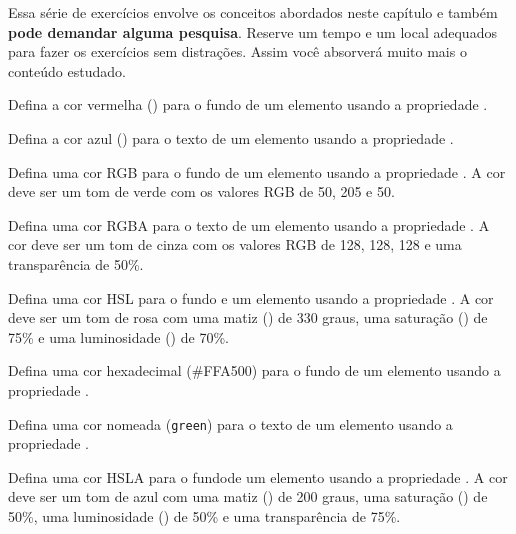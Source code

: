 Essa série de exercícios envolve os conceitos abordados neste capítulo e também \textbf{pode demandar alguma pesquisa}. Reserve um tempo e um local adequados para fazer os exercícios sem distrações. Assim você absorverá muito mais o conteúdo estudado.

\begin{exercise}
Defina a cor vermelha () para o fundo de um elemento usando a propriedade .
\end{exercise}

\begin{exercise}
Defina a cor azul () para o texto de um elemento usando a propriedade .
\end{exercise}

\begin{exercise}
Defina uma cor RGB para o fundo de um elemento usando a propriedade . A cor deve ser um tom de verde com os valores RGB de 50, 205 e 50.
\end{exercise}

\begin{exercise}
Defina uma cor RGBA para o texto de um elemento usando a propriedade . A cor deve ser um tom de cinza com os valores RGB de 128, 128, 128 e uma transparência de 50\%.
\end{exercise}

\begin{exercise}
Defina uma cor HSL para o fundo e um elemento usando a propriedade . A cor deve ser um tom de rosa com uma matiz () de 330 graus, uma saturação () de 75\% e uma luminosidade () de 70\%.
\end{exercise}

\begin{exercise}
Defina uma cor hexadecimal (\#FFA500) para o fundo de um elemento usando a propriedade .
\end{exercise}

\begin{exercise}
Defina uma cor nomeada (\texttt{green}) para o texto de um elemento usando a propriedade .
\end{exercise}

\begin{exercise}
Defina uma cor HSLA para o fundode um elemento usando a propriedade . A cor deve ser um tom de azul com uma matiz () de 200 graus, uma saturação () de 50\%, uma luminosidade () de 50\% e uma transparência de 75\%.
\end{exercise}

